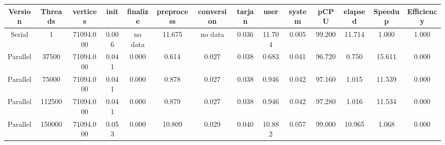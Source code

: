 \begin{tabular}{|c|c|c|c|c|c|c|c|c|c|c|c|c|c|}
\toprule
 Version &  Threads &   vertices &  init & finalize &  preprocess & conversion &  tarjan &   user &  system &   pCPU &  elapsed &  Speedup &  Efficiency \\
\midrule
  Serial &        1 &  71094.000 & 0.006 &  no data &      11.675 &    no data &   0.036 & 11.704 &   0.005 & 99.200 &   11.714 &    1.000 &       1.000 \\
Parallel &    37500 &  71094.000 & 0.041 &    0.000 &       0.614 &      0.027 &   0.038 &  0.683 &   0.041 & 96.720 &    0.750 &   15.611 &       0.000 \\
Parallel &    75000 &  71094.000 & 0.041 &    0.000 &       0.878 &      0.027 &   0.038 &  0.946 &   0.042 & 97.160 &    1.015 &   11.539 &       0.000 \\
Parallel &   112500 &  71094.000 & 0.041 &    0.000 &       0.879 &      0.027 &   0.038 &  0.946 &   0.042 & 97.280 &    1.016 &   11.534 &       0.000 \\
Parallel &   150000 &  71094.000 & 0.053 &    0.000 &      10.809 &      0.029 &   0.040 & 10.882 &   0.057 & 99.000 &   10.965 &    1.068 &       0.000 \\
\bottomrule
\end{tabular}
